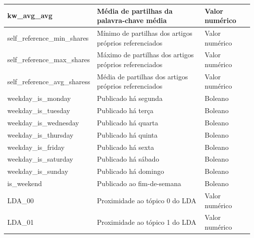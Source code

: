 \begin{table}
{\begin{tabular}{|l|l|l|}
kw\_avg\_avg                     & Média de partilhas da palavra-chave média                                                     & Valor numérico \\ \hline
self\_reference\_min\_shares     & Mínimo de partilhas dos artigos próprios referenciados                                        & Valor numérico \\ \hline
self\_reference\_max\_shares     & Máximo de partilhas dos artigos próprios referenciados                                        & Valor numérico \\ \hline
self\_reference\_avg\_sharess    & Média de partilhas dos artigos próprios referenciados                                         & Valor numérico \\ \hline
weekday\_is\_monday              & Publicado há segunda                                                                          & Boleano        \\ \hline
weekday\_is\_tuesday             & Publicado há terça                                                                            & Boleano        \\ \hline
weekday\_is\_wednesday           & Publicado há quarta                                                                           & Boleano        \\ \hline
weekday\_is\_thursday            & Publicado há quinta                                                                           & Boleano        \\ \hline
weekday\_is\_friday              & Publicado há sexta                                                                            & Boleano        \\ \hline
weekday\_is\_saturday            & Publicado há sábado                                                                           & Boleano        \\ \hline
weekday\_is\_sunday              & Publicado há domingo                                                                          & Boleano        \\ \hline
is\_weekend                      & Publicado ao fim-de-semana                                                                    & Boleano        \\ \hline
LDA\_00                          & Proximidade ao tópico 0 do LDA                                                                & Valor numérico \\ \hline
LDA\_01                          & Proximidade ao tópico 1 do LDA                                                                & Valor numérico \\ \hline

\end{tabular}}
\end{table}
